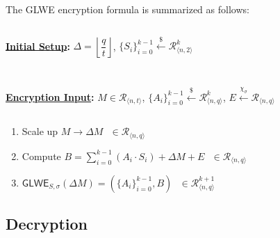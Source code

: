 $ $

The GLWE encryption formula is summarized as follows:

$ $

\begin{tcolorbox}[title={\textbf{\tboxlabel{\ref*{subsec:glwe-enc}} GLWE Encryption}}]

\textbf{\underline{Initial Setup}:} $\Delta = \left\lfloor\dfrac{q}{t}\right\rfloor$, $\{S_i\}_{i=0}^{k-1} \xleftarrow{\$} \mathcal{R}_{\langle n, 2 \rangle}^k$

$ $

$ $

\textbf{\underline{Encryption Input}:} $M \in \mathcal{R}_{\langle n, t \rangle}$, $\{A_i\}_{i=0}^{k-1} \xleftarrow{\$} \mathcal{R}_{\langle n,q \rangle}^{k}$, $E \xleftarrow{\chi_\sigma} \mathcal{R}_{\langle n,q \rangle}$

$ $

\begin{enumerate}

\item Scale up $M \longrightarrow \Delta M \text { } \in \mathcal{R}_{\langle n, q\rangle}$

\item Compute $B = \sum\limits_{i=0}^{k-1}{(A_i \cdot S_i)} + \Delta  M + E \text{ } \in \mathcal{R}_{\langle n,q \rangle}$

\item $\textsf{GLWE}_{S,\sigma}(\Delta M) = (\{A_i\}_{i=0}^{k-1}, B) \text{ } \in \mathcal{R}_{\langle n,q \rangle}^{k + 1}$ 



\end{enumerate}

\end{tcolorbox}

\subsection{Decryption}
\label{subsec:glwe-dec}

